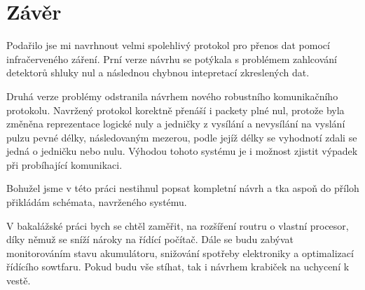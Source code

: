\chapter{Závěr}

Podařilo jse mi navrhnout velmi spolehlivý protokol pro přenos dat pomocí infračerveného záření. Prní verze návrhu se potýkala s problémem zahlcování detektorů shluky nul a následnou  chybnou intepretací zkreslených dat.

Druhá verze problémy odstranila návrhem nového robustního komunikačního protokolu. Navržený protokol korektně přenáší i packety plné nul, protože byla změněna reprezentace logické nuly a jedničky z vysílání a nevysílání na vyslání pulzu pevné délky, následovaným mezerou, podle jejíž délky se vyhodnotí zdali se jedná o jedničku nebo nulu. Výhodou tohoto systému je i možnost zjistit výpadek při probíhající komunikaci.

Bohužel jsme v této práci nestihnul popsat kompletní návrh a tka aspoň do příloh přikládám schémata, navrženého systému.

V bakalážské práci bych se chtěl zaměřit, na rozšíření routru o vlastní procesor, díky němuž se sníží nároky na řídící počítač. Dále se budu zabývat monitorováním stavu akumulátoru, snižování spotřeby elektroniky a optimalizací řídícího sowtfaru. Pokud budu vše stíhat, tak i návrhem krabiček na uchycení k vestě.

